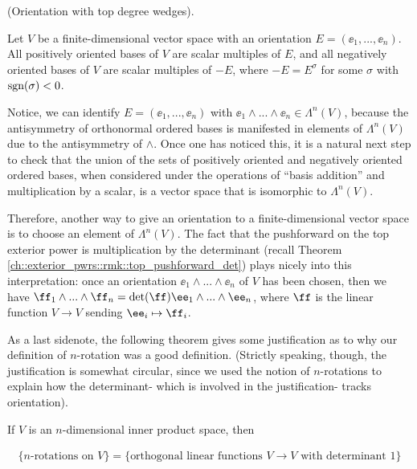 \begin{theorem}
\label{ch::exterior_pwrs::defn::orientation_with_top_degree_wedges}

    (Orientation with top degree wedges).
    
    Let $V$ be a finite-dimensional vector space with an orientation $E = (\ee_1, ..., \ee_n)$. All positively oriented bases of $V$ are scalar multiples of $E$, and all negatively oriented bases of $V$ are scalar multiples of $-E$, where $-E = E^\sigma$ for some $\sigma$ with $\text{sgn}(\sigma) < 0$.
    
    Notice, we can identify $E = (\ee_1, ..., \ee_n)$ with $\ee_1 \wedge ... \wedge \ee_n \in \Lambda^n(V)$, because the antisymmetry of orthonormal ordered bases is manifested in elements of $\Lambda^n(V)$ due to the antisymmetry of $\wedge$. Once one has noticed this, it is a natural next step to check that the union of the sets of positively oriented and negatively oriented ordered bases, when considered under the operations of ``basis addition'' and multiplication by a scalar, is a vector space that is isomorphic to $\Lambda^n(V)$.
    
    Therefore, another way to give an orientation to a finite-dimensional vector space is to choose an element of $\Lambda^n(V)$. The fact that the pushforward on the top exterior power is multiplication by the determinant (recall Theorem \ref{ch::exterior_pwrs::rmk::top_pushforward_det}) plays nicely into this interpretation: once an orientation $\ee_1 \wedge ... \wedge \ee_n$ of $V$ has been chosen, then we have $\ff_1 \wedge ... \wedge \ff_n = \det(\ff) \ee_1 \wedge ... \wedge \ee_n$, where $\ff$ is the linear function $V \rightarrow V$ sending $\ee_i \mapsto \ff_i$.
\end{theorem}

As a last sidenote, the following theorem gives some justification as to why our definition of $n$-rotation was a good definition. (Strictly speaking, though, the justification is somewhat circular, since we used the notion of $n$-rotations to explain how the determinant- which is involved in the justification- tracks orientation).

\begin{theorem}
    If $V$ is an $n$-dimensional inner product space, then 
    
    \begin{align*}
        \{\text{$n$-rotations on $V$}\} = \{\text{orthogonal linear functions $V \rightarrow V$ with determinant 1}\}
    \end{align*}
\end{theorem}

